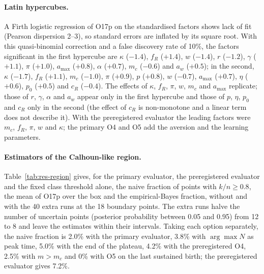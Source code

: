 \paragraph{Latin hypercubes.}
A Firth logistic regression of O17p on the standardised factors shows lack of fit (Pearson dispersion 2--3), so
standard errors are inflated by its square root. With this quasi-binomial correction and a false discovery rate of
10\%, the factors significant in the first hypercube are $\kappa$ ($-1.4$), $f_R$ ($+1.4$), $w$ ($-1.4$), $r$
($-1.2$), $\gamma$ ($+1.1$), $\pi$ ($+1.0$), $a_{\max}$ ($+0.8$), $\alpha$ ($+0.7$), $m_c$ ($-0.6$) and $a_w$
($+0.5$); in the second, $\kappa$ ($-1.7$), $f_R$ ($+1.1$), $m_c$ ($-1.0$), $\pi$ ($+0.9$), $p$ ($+0.8$), $w$ ($-0.7$),
$a_{\max}$ ($+0.7$), $\eta$ ($+0.6$), $p_0$ ($+0.5$) and $c_R$ ($-0.4$). The effects of $\kappa$, $f_R$, $\pi$, $w$,
$m_c$ and $a_{\max}$ replicate; those of $r$, $\gamma$, $\alpha$ and $a_w$ appear only in the first hypercube and
those of $p$, $\eta$, $p_0$ and $c_R$ only in the second (the effect of $c_R$ is non-monotone and a linear term does
not describe it). With the preregistered evaluator the leading factors were $m_c$, $f_R$, $\pi$, $w$ and $\kappa$; the
primary O4 and O5 add the aversion and the learning parameters.

\paragraph{Estimators of the Calhoun-like region.}
Table~\ref{tab:res-region} gives, for the primary evaluator, the preregistered evaluator and the fixed class threshold
alone, the naive fraction of points with $k/n\ge0.8$, the mean of O17p over the box and the empirical-Bayes
fraction, without and with the 40 extra runs at the 18 boundary points. The extra runs halve the number of
uncertain points (posterior probability between 0.05 and 0.95) from 12 to 8 and leave the estimates within their
intervals. Taking each option separately, the naive fraction is 2.0\% with the primary evaluator, 3.8\% with
$\arg\max N$ as peak time, 5.0\% with the end of the plateau, 4.2\% with the preregistered O4, 2.5\% with $m>m_c$ and
0\% with O5 on the last sustained birth; the preregistered evaluator gives 7.2\%.

